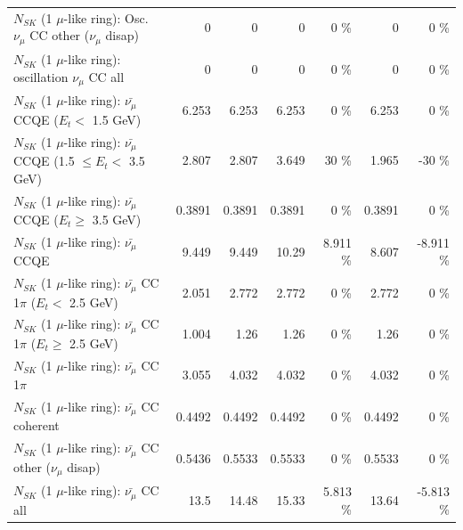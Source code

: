 \begin{table}
\begin{tabular}{| l | r | r | r  r | r  r |}
         $N_{SK}$ (1 $\mu$-like ring): Osc. $\nu_\mu$ CC other ($\nu_\mu$ disap) &               0 &               0 &               0 &        0 \%  &               0 &        0 \%  \\ 
                      $N_{SK}$ (1 $\mu$-like ring): oscillation $\nu_\mu$ CC all &               0 &               0 &               0 &        0 \%  &               0 &        0 \%  \\ 
\hline
\hline
          $N_{SK}$ (1 $\mu$-like ring): $\bar{\nu_\mu}$ CCQE ($E_{t} <$ 1.5 GeV) &           6.253 &           6.253 &           6.253 &        0 \%  &           6.253 &        0 \%  \\ 
 $N_{SK}$ (1 $\mu$-like ring): $\bar{\nu_\mu}$ CCQE (1.5 $\leq E_{t} <$ 3.5 GeV) &           2.807 &           2.807 &           3.649 &       30 \%  &           1.965 &      -30 \%  \\ 
       $N_{SK}$ (1 $\mu$-like ring): $\bar{\nu_\mu}$ CCQE ($E_{t} \geq$ 3.5 GeV) &          0.3891 &          0.3891 &          0.3891 &        0 \%  &          0.3891 &        0 \%  \\ 
\hline
                              $N_{SK}$ (1 $\mu$-like ring): $\bar{\nu_\mu}$ CCQE &           9.449 &           9.449 &           10.29 &    8.911 \%  &           8.607 &   -8.911 \%  \\ 
\hline
     $N_{SK}$ (1 $\mu$-like ring): $\bar{\nu_\mu}$ CC 1$\pi$ ($E_{t} <$ 2.5 GeV) &           2.051 &           2.772 &           2.772 &        0 \%  &           2.772 &        0 \%  \\ 
  $N_{SK}$ (1 $\mu$-like ring): $\bar{\nu_\mu}$ CC 1$\pi$ ($E_{t} \geq$ 2.5 GeV) &           1.004 &            1.26 &            1.26 &        0 \%  &            1.26 &        0 \%  \\ 
\hline
                         $N_{SK}$ (1 $\mu$-like ring): $\bar{\nu_\mu}$ CC 1$\pi$ &           3.055 &           4.032 &           4.032 &        0 \%  &           4.032 &        0 \%  \\ 
                       $N_{SK}$ (1 $\mu$-like ring): $\bar{\nu_\mu}$ CC coherent &          0.4492 &          0.4492 &          0.4492 &        0 \%  &          0.4492 &        0 \%  \\ 
        $N_{SK}$ (1 $\mu$-like ring): $\bar{\nu_\mu}$ CC other ($\nu_\mu$ disap) &          0.5436 &          0.5533 &          0.5533 &        0 \%  &          0.5533 &        0 \%  \\ 
                          $N_{SK}$ (1 $\mu$-like ring): $\bar{\nu_{\mu}}$ CC all &            13.5 &           14.48 &           15.33 &    5.813 \%  &           13.64 &   -5.813 \%  \\ 

\end{tabular}
\end{table}
